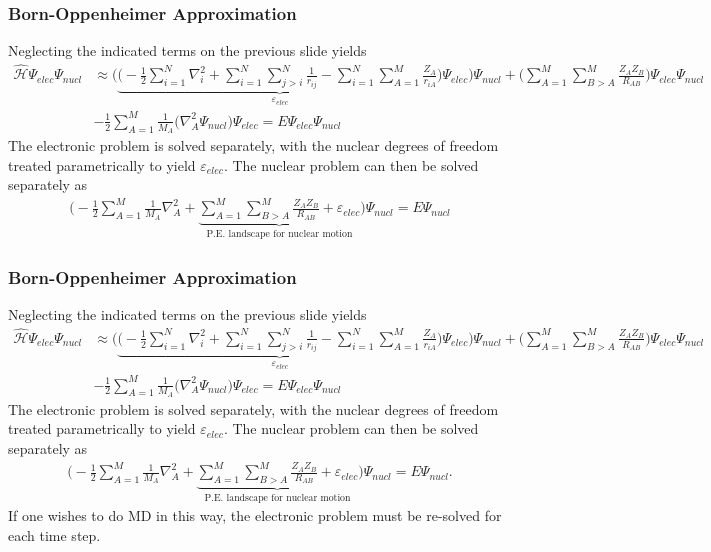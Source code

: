 \documentclass{beamer}
\newcommand{\Ham}{\widehat{\mathcal{H}}}
\newenvironment{noheadline}{
	\setbeamertemplate{headline}{}
	\addtobeamertemplate{frametitle}{\vspace*{-0.9\baselineskip}}{}
}{}
\begin{document}
\begin{noheadline}
\begin{frame}
\frametitle{Born-Oppenheimer Approximation}
{\tiny
Neglecting the indicated terms on the previous slide yields
	\begin{align*}
	\Ham \Psi_{elec} \Psi_{nucl} &\approx \bigg( \underbrace{\bigg( -\frac{1}{2}\sum_{i=1}^{N} \nabla^{2}_{i} + \sum_{i=1}^{N} \sum_{j>i}^{N} \frac{1}{r_{ij}} - \sum_{i=1}^{N} \sum_{A = 1}^{M} \frac{Z_{A}}{r_{iA}} \bigg)}_{\varepsilon_{elec}} \Psi_{elec} \bigg) \Psi_{nucl} + \bigg( \sum_{A=1}^{M} \sum_{B>A}^{M} \frac{Z_{A} Z_{B}}{R_{AB}} \bigg) \Psi_{elec} \Psi_{nucl}\\
	&-\frac{1}{2} \sum_{A=1}^{M} \frac{1}{M_{A}} \big(\nabla_{A}^{2} \Psi_{nucl} \big) \Psi_{elec} = E \Psi_{elec} \Psi_{nucl} 
	\end{align*}
	The electronic problem is solved separately, with the nuclear degrees of freedom treated parametrically to yield $\varepsilon_{elec}$. The nuclear problem can then be solved separately as
	\begin{align*}
	\bigg( -\frac{1}{2} \sum_{A=1}^{M} \frac{1}{M_{A}} \nabla_{A}^{2} + \underbrace{\sum_{A=1}^{M} \sum_{B>A}^{M} \frac{Z_{A} Z_{B}}{R_{AB}} + \varepsilon_{elec}}_\text{P.E. landscape for nuclear motion} \bigg) \Psi_{nucl} = E \Psi_{nucl}
	\end{align*}
}
\end{frame}

\begin{frame}
\frametitle{Born-Oppenheimer Approximation}
{\tiny
	Neglecting the indicated terms on the previous slide yields
	\begin{align*}
	\Ham \Psi_{elec} \Psi_{nucl} &\approx \bigg( \underbrace{\bigg( -\frac{1}{2}\sum_{i=1}^{N} \nabla^{2}_{i} + \sum_{i=1}^{N} \sum_{j>i}^{N} \frac{1}{r_{ij}} - \sum_{i=1}^{N} \sum_{A = 1}^{M} \frac{Z_{A}}{r_{iA}} \bigg)}_{\varepsilon_{elec}} \Psi_{elec} \bigg) \Psi_{nucl} + \bigg( \sum_{A=1}^{M} \sum_{B>A}^{M} \frac{Z_{A} Z_{B}}{R_{AB}} \bigg) \Psi_{elec} \Psi_{nucl}\\
	&-\frac{1}{2} \sum_{A=1}^{M} \frac{1}{M_{A}} \big(\nabla_{A}^{2} \Psi_{nucl} \big) \Psi_{elec} = E \Psi_{elec} \Psi_{nucl} 
	\end{align*}
	The electronic problem is solved separately, with the nuclear degrees of freedom treated parametrically to yield $\varepsilon_{elec}$. The nuclear problem can then be solved separately as
	\begin{align*}
	\bigg( -\frac{1}{2} \sum_{A=1}^{M} \frac{1}{M_{A}} \nabla_{A}^{2} + \underbrace{\sum_{A=1}^{M} \sum_{B>A}^{M} \frac{Z_{A} Z_{B}}{R_{AB}} + \varepsilon_{elec}}_\text{P.E. landscape for nuclear motion} \bigg) \Psi_{nucl} = E \Psi_{nucl}.
	\end{align*}
	If one wishes to do MD in this way, the electronic problem must be re-solved for each time step.
}
\end{frame}



\end{noheadline}
\end{document}
